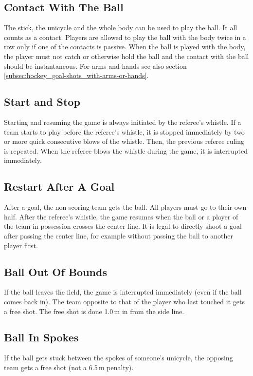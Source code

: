 \subsection{Contact With The Ball}
The stick, the unicycle and the whole body can be used to play the ball.
It all counts as a contact.
Players are allowed to play the ball with the body twice in a row only if one of the contacts is passive.
When the ball is played with the body, the player must not catch or otherwise hold the ball and the contact with the ball should be instantaneous.
For arms and hands see also section \ref{subsec:hockey_goal-shots_with-arms-or-hands}.

\subsection{Start and Stop}
Starting and resuming the game is always initiated by the referee's whistle.
If a team starts to play before the referee's whistle, it is stopped immediately by two or more quick consecutive blows of the whistle.
Then, the previous referee ruling is repeated.
When the referee blows the whistle during the game, it is interrupted immediately.

\subsection{Restart After A Goal}
After a goal, the non-scoring team gets the ball.
All players must go to their own half.
After the referee's whistle, the game resumes when the ball or a player of the team in possession crosses the center line.
It is legal to directly shoot a goal after passing the center line, for example without passing the ball to another player first.

\subsection{Ball Out Of Bounds}
If the ball leaves the field, the game is interrupted immediately (even if the ball comes back in).
The team opposite to that of the player who last touched it gets a free shot.
The free shot is done 1.0\,m in from the side line.

\subsection{Ball In Spokes}
If the ball gets stuck between the spokes of someone's unicycle, the opposing team gets a free shot (not a 6.5\,m penalty).

